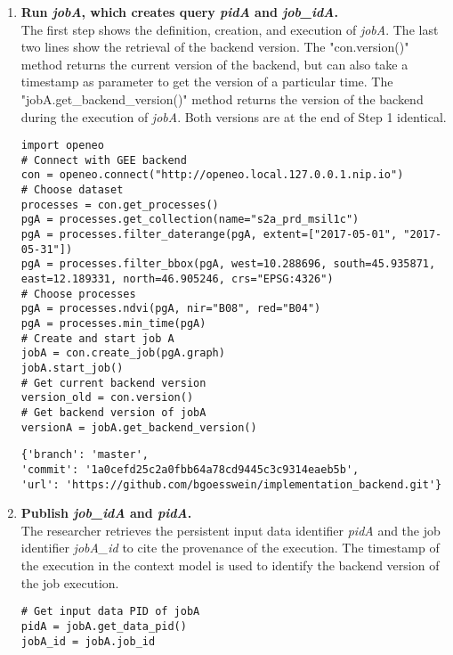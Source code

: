 \documentclass[draft,final]{vutinfth} %
\newenvironment{code}{\captionsetup{type=listing}}{}
\begin{document}
\begin{enumerate}
	\item \textbf{Run \textit{jobA}, which creates query \textit{pidA} and \textit{job\_idA}.} \\
	The first step shows the definition, creation, and execution of \textit{jobA}. The last two lines show the retrieval of the backend version. The "con.version()" method returns the current version of the backend, but can also take a timestamp as parameter to get the version of a particular time. The "jobA.get\_backend\_version()" method returns the version of the backend during the execution of \textit{jobA}. Both versions are at the end of Step 1 identical. 
	\begin{code}
		\begin{verbatim}
import openeo
# Connect with GEE backend
con = openeo.connect("http://openeo.local.127.0.0.1.nip.io")
# Choose dataset
processes = con.get_processes()
pgA = processes.get_collection(name="s2a_prd_msil1c")
pgA = processes.filter_daterange(pgA, extent=["2017-05-01", "2017-05-31"])
pgA = processes.filter_bbox(pgA, west=10.288696, south=45.935871, 
east=12.189331, north=46.905246, crs="EPSG:4326")
# Choose processes
pgA = processes.ndvi(pgA, nir="B08", red="B04")
pgA = processes.min_time(pgA)
# Create and start job A
jobA = con.create_job(pgA.graph)
jobA.start_job()
# Get current backend version
version_old = con.version()
# Get backend version of jobA 
versionA = jobA.get_backend_version()
		\end{verbatim}
		\caption{Step 1: Researcher runs \textit{jobA} and gets the used backend version.}
		\label{lst:eva_jobcapture_1}
	\end{code}
	
	\begin{code}
		\begin{verbatim}
{'branch': 'master',
'commit': '1a0cefd25c2a0fbb64a78cd9445c3c9314eaeb5b',
'url': 'https://github.com/bgoesswein/implementation_backend.git'}
		\end{verbatim}
		\caption{Step 1: Version of the \textit{jobA} execution \textit{version\_old}.}
		\label{lst:eva_jobcapture_1_1}
	\end{code} 

	\item \textbf{Publish \textit{job\_idA} and \textit{pidA}.} \\
	The researcher retrieves the persistent input data identifier \textit{pidA} and the job identifier \textit{jobA\_id} to cite the provenance of the execution. The timestamp of the execution in the context model is used to identify the backend version of the job execution.
	\begin{code}
		\begin{verbatim}
# Get input data PID of jobA 
pidA = jobA.get_data_pid()
jobA_id = jobA.job_id
		\end{verbatim}
		\caption{Researcher gets the input data PID of \textit{jobA} and the \textit{job\_id} of \textit{jobA}.}
		\label{lst:eva_jobcapture_2}
	\end{code}
	

\end{enumerate}
\end{document}
